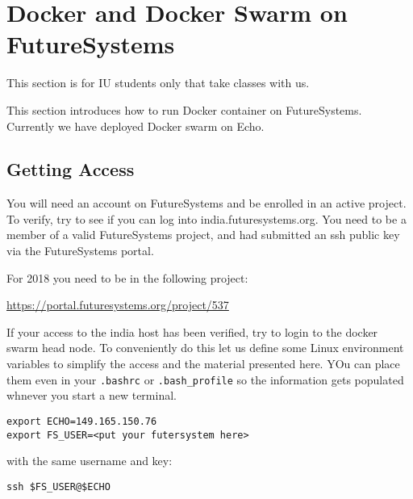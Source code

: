 
\chapter{Docker and Docker Swarm on FutureSystems}\label{S:docker-fg}

\FILENAME

\begin{IU}

This section is for IU students only that take classes with us.
\end{IU}

This section introduces how to run Docker container on
FutureSystems. Currently we have deployed Docker swarm on Echo.

\section{Getting Access}

You will need an account on FutureSystems and be enrolled in an active
project.  To verify, try to see if you can log into
india.futuresystems.org. You need to be a member of a valid
FutureSystems project, and had submitted an ssh public key via the
FutureSystems portal.

\begin{IU}
For 2018 you need to be in the following project:

\url{https://portal.futuresystems.org/project/537}

\end{IU}

If your access to the india host has been verified, try to login to
the docker swarm head node. To conveniently do this let us define some
Linux environment variables to simplify the access and the material
presented here. YOu can place them even in your \verb|.bashrc| or
\verb|.bash_profile| so the information gets populated whnever you start a
new terminal.

\begin{lstlisting}
export ECHO=149.165.150.76
export FS_USER=<put your futersystem here>
\end{lstlisting}


with the same username and key:

\begin{lstlisting}
ssh $FS_USER@$ECHO
\end{lstlisting}

